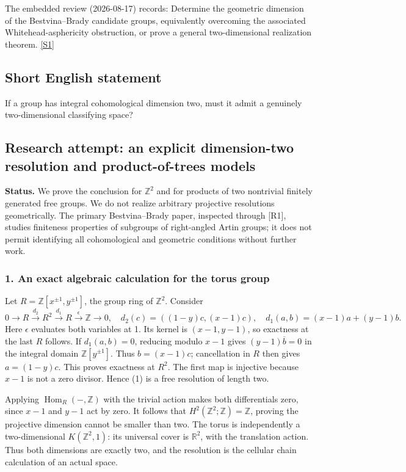 \documentclass[11pt,a4paper]{article}
\newcommand{\sref}[2]{\hyperlink{source:#1:#2}{[S#2]}}
\begin{document}
The embedded review (2026-08-17) records: Determine the geometric dimension of the Bestvina--Brady candidate groups, equivalently overcoming the associated Whitehead-asphericity obstruction, or prove a general two-dimensional realization theorem. \sref{statement}{1}

\subsection{Short English statement}

If a group has integral cohomological dimension two, must it admit a genuinely two-dimensional classifying space?

\subsection{Research attempt: an explicit dimension-two resolution and product-of-trees models}
\textbf{Status.} We prove the conclusion for $\mathbb Z^2$ and for products of two nontrivial finitely generated free groups. We do not realize arbitrary projective resolutions geometrically. The primary Bestvina--Brady paper, inspected through [R1], studies finiteness properties of subgroups of right-angled Artin groups; it does not permit identifying all cohomological and geometric conditions without further work.

\subsubsection{1. An exact algebraic calculation for the torus group}
Let $R=\mathbb Z[x^{\pm1},y^{\pm1}]$, the group ring of $\mathbb Z^2$. Consider
\[0\longrightarrow R\xrightarrow{d_2}R^2\xrightarrow{d_1}R
\xrightarrow{\epsilon}\mathbb Z\longrightarrow0,
\quad d_2(c)=((1-y)c,(x-1)c),\quad
d_1(a,b)=(x-1)a+(y-1)b.\tag{1}\]
Here $\epsilon$ evaluates both variables at 1. Its kernel is $(x-1,y-1)$, so exactness at the last $R$ follows. If $d_1(a,b)=0$, reducing modulo $x-1$ gives $(y-1)\overline b=0$ in the integral domain $\mathbb Z[y^{\pm1}]$. Thus $b=(x-1)c$; cancellation in $R$ then gives $a=(1-y)c$. This proves exactness at $R^2$. The first map is injective because $x-1$ is not a zero divisor. Hence (1) is a free resolution of length two.

Applying $\operatorname{Hom}_R(-,\mathbb Z)$ with the trivial action makes both differentials zero, since $x-1$ and $y-1$ act by zero. It follows that $H^2(\mathbb Z^2;\mathbb Z)=\mathbb Z$, proving the projective dimension cannot be smaller than two. The torus is independently a two-dimensional $K(\mathbb Z^2,1)$: its universal cover is $\mathbb R^2$, with the translation action. Thus both dimensions are exactly two, and the resolution is the cellular chain calculation of an actual space.
\end{document}
